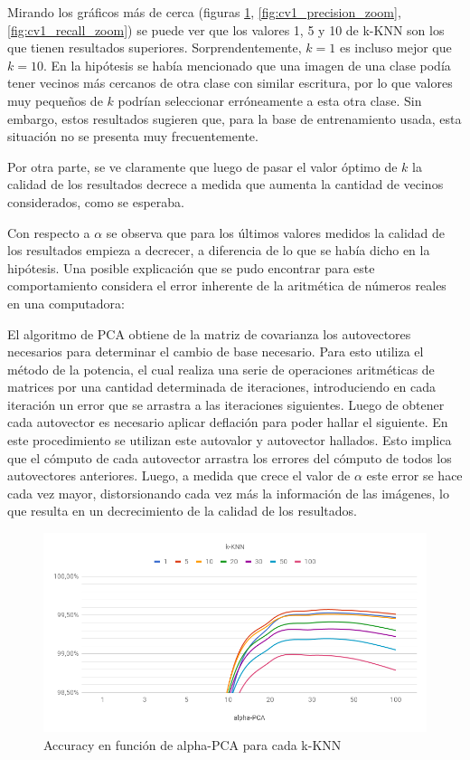 Mirando los gráficos más de cerca (figuras \ref{fig:cv1_accuracy_zoom}, \ref{fig:cv1_precision_zoom}, \ref{fig:cv1_recall_zoom}) se puede ver que los valores 1, 5 y 10 de k-KNN son los que tienen resultados superiores. Sorprendentemente, $k = 1$ es incluso mejor que $k = 10$. En la hipótesis se había mencionado que una imagen de una clase podía tener vecinos más cercanos de otra clase con similar escritura, por lo que valores muy pequeños de $k$ podrían seleccionar erróneamente a esta otra clase. Sin embargo, estos resultados sugieren que, para la base de entrenamiento usada, esta situación no se presenta muy frecuentemente.

Por otra parte, se ve claramente que luego de pasar el valor óptimo de $k$ la calidad de los resultados decrece a medida que aumenta la cantidad de vecinos considerados, como se esperaba.

Con respecto a $\alpha$ se observa que para los últimos valores medidos la calidad de los resultados empieza a decrecer, a diferencia de lo que se había dicho en la hipótesis. Una posible explicación que se pudo encontrar para este comportamiento considera el error inherente de la aritmética de números reales en una computadora:

El algoritmo de PCA obtiene de la matriz de covarianza los autovectores necesarios para determinar el cambio de base necesario. Para esto utiliza el método de la potencia, el cual realiza una serie de operaciones aritméticas de matrices por una cantidad determinada de iteraciones, introduciendo en cada iteración un error que se arrastra a las iteraciones siguientes. Luego de obtener cada autovector es necesario aplicar deflación para poder hallar el siguiente. En este procedimiento se utilizan este autovalor y autovector hallados. Esto implica que el cómputo de cada autovector arrastra los errores del cómputo de todos los autovectores anteriores. Luego, a medida que crece el valor de $\alpha$ este error se hace cada vez mayor, distorsionando cada vez más la información de las imágenes, lo que resulta en un decrecimiento de la calidad de los resultados.

\begin{figure}[h]
    \centering
    \includegraphics[width=\textwidth]{graficos/cv1_accuracy_zoom.png}
    \caption{Accuracy en función de alpha-PCA para cada k-KNN}
    \label{fig:cv1_accuracy_zoom}
\end{figure}

